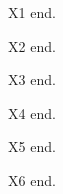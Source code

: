 X1 \textcite{x1} \parencite{x1} end.

X2 \textcite{x2} end.

X3 \textcite{x3} end.

X4 \textcite{x4} end.

X5 \textcite{x5} end.

X6 \textcite{x6} end.
